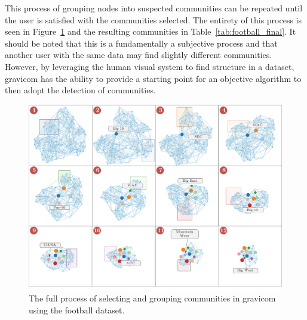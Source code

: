 \documentclass{article}\usepackage[]{graphicx}\usepackage[]{color}
\begin{document}
This process of grouping nodes into suspected communities can be repeated until the user is satisfied with the communities selected. The entirety of this process is seen in Figure~\ref{fig:football_progression} and the resulting communities in Table~\ref{tab:football_final}. It should be noted that this is a fundamentally a subjective process and that another user with the same data may find slightly different communities. However, by leveraging the human visual system to find structure in a dataset, gravicom has the ability to provide a starting point for an objective algorithm to then adopt the detection of communities. 

\begin{figure}[H]
\centering
\includegraphics[width=\textwidth]{images/football_progression.png}
\caption{\label{fig:football_progression}The full process of selecting and grouping communities in gravicom using the football dataset.}
\end{figure}
\end{document}
